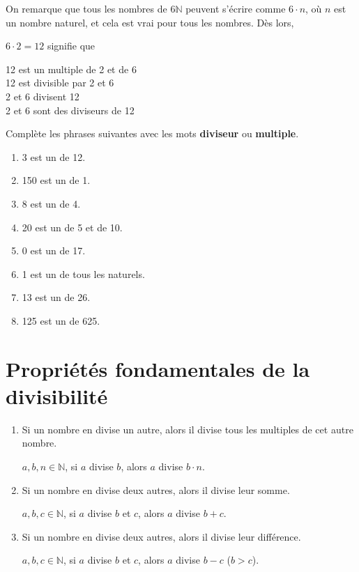 \documentclass[../../syllabus_1.tex]{subfiles}
\begin{document}
On remarque que tous les nombres de $6\mathbb{N}$ peuvent s'écrire comme $6\cdot n$, où $n$ est un nombre naturel, et cela est vrai pour tous les nombres.
Dès lors,

$6 \cdot 2 = 12$ signifie que \parbox[t]{10cm}{
      12 est un multiple de 2 et de 6\\
      12 est divisible par 2 et 6\\
      2 et 6 divisent 12\\
      2 et 6 sont des diviseurs de 12}

\begin{exercise}
      Complète les phrases suivantes avec les mots \textbf{diviseur} ou \textbf{multiple}.
      \begin{enumerate}[cols=2, itemsep=2em]
            \item 3 est un  de 12.
            \item 150 est un  de 1.
            \item 8 est un  de 4.
            \item 20 est un  de 5 et de 10.
            \item 0 est un  de 17.
            \item 1 est un  de tous les naturels.
            \item 13 est un  de 26.
            \item 125 est un  de 625.
      \end{enumerate}
\end{exercise}

\newpage
\section{Propriétés fondamentales de la divisibilité}
\begin{enumerate}[wide]
      \item Si un nombre en divise un autre, alors il divise tous les multiples de cet autre nombre.

            \(a,b,n \in \mathbb{N}\), si \(a\) divise \(b\), alors \(a\) divise \(b \cdot n\).
      \item Si un nombre en divise deux autres, alors il divise leur somme.

            \(a,b,c \in \mathbb{N}\), si \(a\) divise \(b\) et \(c\), alors \(a\) divise \(b + c\).
      \item Si un nombre en divise deux autres, alors il divise leur différence.

            \(a,b,c \in \mathbb{N}\), si \(a\) divise \(b\) et \(c\), alors \(a\) divise \(b - c\) (\(b > c\)).
\end{enumerate}
\end{document}
